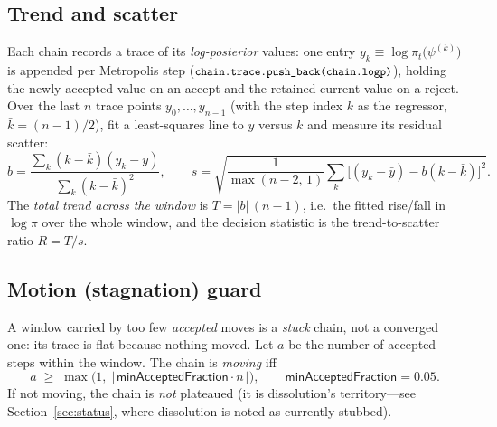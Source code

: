 \documentclass[11pt]{article}
\newcommand{\code}[1]{\texttt{\small #1}}
\newcommand{\param}[1]{\textsf{#1}}
\begin{document}
\subsection{Trend and scatter}
Each chain records a trace of its \emph{log-posterior} values: one entry
$y_k \equiv \log\pi_t\!\big(\psi^{(k)}\big)$ is appended per Metropolis
step ($\code{chain.trace.push\_back(chain.logp)}$), holding the newly
accepted value on an accept and the retained current value on a reject.
Over the last $n$ trace points $y_0,\dots,y_{n-1}$ (with the step index
$k$ as the regressor, $\bar k = (n-1)/2$), fit a least-squares line to
$y$ versus $k$ and measure its residual scatter:
\begin{equation}
  b = \frac{\sum_{k}(k-\bar k)(y_k-\bar y)}{\sum_k (k-\bar k)^2},
  \qquad
  s = \sqrt{\frac{1}{\max(n-2,\,1)}\sum_k\big[(y_k-\bar y)-b(k-\bar k)\big]^2}.
\end{equation}
The \emph{total trend across the window} is $T = |b|\,(n-1)$, i.e.\ the
fitted rise/fall in $\log\pi$ over the whole window, and the decision
statistic is the trend-to-scatter ratio $R = T/s$.

\subsection{Motion (stagnation) guard}
A window carried by too few \emph{accepted} moves is a \emph{stuck} chain,
not a converged one: its trace is flat because nothing moved. Let $a$ be
the number of accepted steps within the window. The chain is
\emph{moving} iff
\begin{equation}
  a \;\ge\; \max\!\big(1,\ \lfloor \param{minAcceptedFraction}\cdot n\rfloor\big),
  \qquad \param{minAcceptedFraction}=0.05.
\end{equation}
If not moving, the chain is \emph{not} plateaued (it is dissolution's
territory---see Section~\ref{sec:status}, where dissolution is noted as
currently stubbed).
\end{document}
